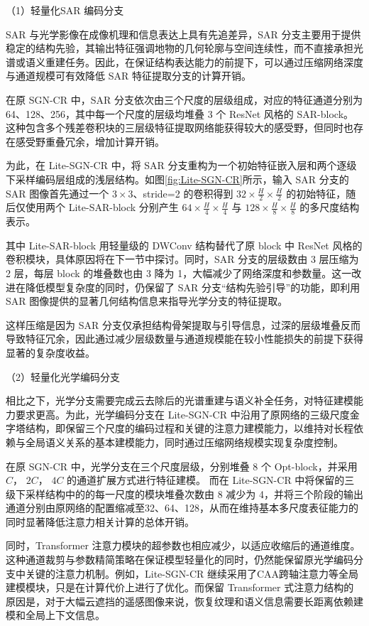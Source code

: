 （1）轻量化SAR 编码分支

SAR 与光学影像在成像机理和信息表达上具有先追差异，SAR 分支主要用于提供稳定的结构先验，其输出特征强调地物的几何轮廓与空间连续性，而不直接承担光谱或语义重建任务。因此，在保证结构表达能力的前提下，可以通过压缩网络深度与通道规模可有效降低 SAR 特征提取分支的计算开销。

在原 SGN-CR 中，SAR 分支依次由三个尺度的层级组成，对应的特征通道分别为 64、128、256，其中每一个尺度的层级均堆叠 3 个 ResNet 风格的 SAR-block。这种包含多个残差卷积块的三层级特征提取网络能获得较大的感受野，但同时也存在感受野重叠冗余，增加计算开销。

为此，在 Lite-SGN-CR 中，将 SAR 分支重构为一个初始特征嵌入层和两个逐级下采样编码层组成的浅层结构。如图\ref{fig:Lite-SGN-CR}所示，输入 SAR 分支的 SAR 图像首先通过一个 $3\times3$、stride=2 的卷积得到 $32\times \frac{H}{2} \times \frac{H}{2}$ 的初始特征，随后仅使用两个 Lite-SAR-block 分别产生 $64\times \frac{H}{4}\times \frac{H}{4}$ 与 $128\times \frac{H}{8}\times \frac{H}{8}$ 的多尺度结构表示。

其中 Lite-SAR-block 用轻量级的 DWConv 结构替代了原 block 中 ResNet 风格的卷积模块，具体原因将在下一节中探讨。同时，SAR 分支的层级数由 3 层压缩为 2 层，每层 block 的堆叠数也由 3 降为 1，大幅减少了网络深度和参数量。这一改进在降低模型复杂度的同时，仍保留了 SAR 分支“结构先验引导”的功能，即利用 SAR 图像提供的显著几何结构信息来指导光学分支的特征提取。

这样压缩是因为 SAR 分支仅承担结构骨架提取与引导信息，过深的层级堆叠反而导致特征冗余，因此通过减少层级数量与通道规模能在较小性能损失的前提下获得显著的复杂度收益。

（2）轻量化光学编码分支

相比之下，光学分支需要完成云去除后的光谱重建与语义补全任务，对特征建模能力要求更高。为此，光学编码分支在 Lite-SGN-CR 中沿用了原网络的三级尺度金字塔结构，即保留三个尺度的编码过程和关键的注意力建模能力，以维持对长程依赖与全局语义关系的基本建模能力，同时通过压缩网络规模实现复杂度控制。

在原 SGN-CR 中，光学分支在三个尺度层级，分别堆叠 8 个 Opt-block，并采用 $C$， $2C$， $4C$ 的通道扩展方式进行特征建模。 而在 Lite-SGN-CR 中将保留的三级下采样结构中的的每一尺度的模块堆叠次数由 8 减少为 4，并将三个阶段的输出通道分别由原网络的配置缩减至32、64、128，从而在维持基本多尺度表征能力的同时显著降低注意力相关计算的总体开销。

同时，Transformer 注意力模块的超参数也相应减少，以适应收缩后的通道维度。这种通道裁剪与参数精简策略在保证模型轻量化的同时，仍然能保留原光学编码分支中关键的注意力机制。例如，Lite-SGN-CR 继续采用了CAA跨轴注意力等全局建模模块，只是在计算代价上进行了优化。而保留 Transformer 式注意力结构的原因是，对于大幅云遮挡的遥感图像来说，恢复纹理和语义信息需要长距离依赖建模和全局上下文信息。

